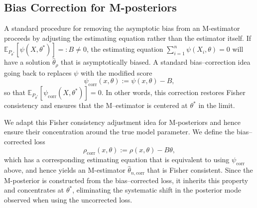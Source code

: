 \documentclass[11pt, oneside]{amsart}
\theoremstyle{definition}   %
\newcommand{\E}{\mathbb{E}}
\newcommand{\loss}{\rho}
\begin{document}
\subsection{Bias Correction for M-posteriors}
%
A standard procedure for removing the asymptotic bias from an M-estimator proceeds by adjusting the estimating equation rather than the estimator itself.  
%
If \(\E_{P_{\theta^*}}[\psi(X, \theta^*)] =: B \neq 0\), the estimating equation \(\sum_{i=1}^n \psi(X_i, \theta) = 0\) will  have a solution \(\hat{\theta}_\loss\) that is asymptotically biased.  A standard bias–correction idea going back to \cite{huber1964} replaces \(\psi\) with the modified score  
%
\[
    \psi_{\mathrm{corr}}(x, \theta) := \psi(x, \theta) - B,
\]
%
so that \(\E_{P_{\theta^*}}[\psi_{\mathrm{corr}}(X, \theta^*)] = 0\). In other words, this correction restores Fisher consistency and ensures that the M–estimator is centered at \(\theta^*\) in the limit.  
%

%
We adapt this Fisher consistency adjustment idea for  M-posteriors and hence ensure their concentration around the true model parameter.
%
We define the bias–corrected loss  
%
\[
\rho_{\mathrm{corr}}(x, \theta) := \rho(x, \theta) - B\theta,
\]
%
which has a corresponding estimating equation that is equivalent to using \(\psi_{\mathrm{corr}}\) above, and hence yields an M-estimator \(\hat{\theta}_{n,\mathrm{corr}}\) that is Fisher consistent.  
%
Since the M-posterior is constructed from the bias–corrected loss, it inherits this property and concentrates at \(\theta^*\), eliminating the systematic shift in the posterior mode observed when using the uncorrected loss.
%
\end{document}
